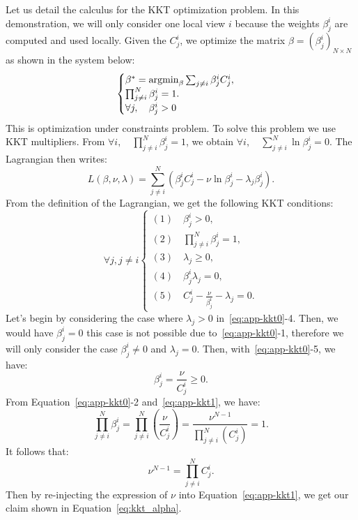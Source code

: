 Let us detail the calculus for the KKT optimization problem. In this demonstration, we will only consider one local view $i$ because the weights $\beta_j^i$ are computed and used locally.
Given the $C_j^i$, we  optimize the matrix $\beta = {\left(\beta_j^i\right)}_{N \times N}$ as shown in the system below:
\begin{equation}
\begin{cases}
\beta^* =  \operatornamewithlimits{argmin}_{\beta}  \sum_{j \neq i} \beta_j^i  C_j^i ,      \\
\prod_{j \neq i}^N \beta_j^i  = 1. \\
\forall j, \quad \beta_j^i >   0 \\      
\end{cases} 
\label{eq:KKT0-app}
\end{equation} 
This is optimization under constraints problem. To solve this problem  we use KKT multipliers.
From   $\forall i, \quad \prod_{j \neq i}^N \beta_j^i  = 1$, we obtain
$\forall i, \quad \sum_{j \neq i}^N \ln  \beta_j^i   = 0$. The Lagrangian then writes: 
\begin{equation}
L(\beta,\nu,\lambda)= \sum_{j \neq i}^N ( \beta_j^i  C_j^i - \nu  \ln  \beta_j^i  - \lambda_j   \beta_j^i ).
\label{eq:Lag-KKT}
\end{equation}
From the definition of the Lagrangian, we get the following KKT conditions:
\begin{equation}
\forall j, j \neq i
\begin{cases}
(1) \quad \beta_j^i > 0,   \\
(2) \quad \prod_{j \neq i}^N \beta_j^i  = 1,  \\
(3) \quad \lambda_j \geq 0,  \\
(4) \quad \beta_j^i  \lambda_j = 0,   \\
(5) \quad  C_j^i -  \frac{\nu}{ \beta_j^i }   - \lambda_j = 0.
\end{cases} 
\label{eq:app-kkt0}
\end{equation} 
Let's begin by considering the case where $\lambda_j > 0$ in~\eqref{eq:app-kkt0}-4. Then, we would have $\beta_j^i=0$  this case is not possible due to~\eqref{eq:app-kkt0}-1, therefore we will only consider the case $\beta_j^i \neq 0$ and $\lambda_j=0$. Then, with~\eqref{eq:app-kkt0}-5, we have:
\begin{equation}
\beta_j^i  =   \frac{\nu} { C_j^i } \geq 0.
\label{eq:app-kkt1}
\end{equation}
From Equation~\eqref{eq:app-kkt0}-2 and~\eqref{eq:app-kkt1}, we have:
\begin{equation}
    \prod_{j \neq i}^N   \beta_j^i  = \prod_{j \neq i}^N  \left(\frac{\nu}{C_j^i } \right)=\frac{\nu^{N-1}} { \prod_{j \neq i}^N  \left( {C_j^i } \right)}  =1.
\end{equation}
It follows that:
$$
\nu^{N-1}  =     \prod_{j \neq i}^N   C_j^i . 
$$
Then by re-injecting the expression of $\nu$ into Equation~\eqref{eq:app-kkt1}, we get our claim  shown in Equation~\eqref{eq:kkt_alpha}.

